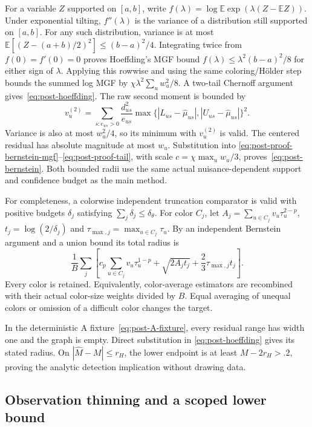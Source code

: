 For a variable $Z$ supported on $[a,b]$, write
$f(\lambda)=\log\mathbb E\exp(\lambda(Z-\mathbb EZ))$. Under exponential
tilting, $f''(\lambda)$ is the variance of a distribution still supported on
$[a,b]$. For any such distribution, variance is at most
$\mathbb E[(Z-(a+b)/2)^2]\leq(b-a)^2/4$. Integrating twice from
$f(0)=f'(0)=0$ proves Hoeffding's MGF bound
$f(\lambda)\leq\lambda^2(b-a)^2/8$ for either sign of $\lambda$.
Applying this rowwise and using the same coloring/H\"older step
bounds the summed log MGF by $\chi\lambda^2\sum_uw_u^2/8$.
A two-tail Chernoff argument gives~\eqref{eq:post-hoeffding}.
The raw second moment is bounded by
\begin{equation}
 v_u^{(2)}=\sum_{s:e_{us}>0}\frac{d_{us}^2}{e_{us}}
            \max\{|L_{us}-\widehat\mu_{us}|,
                   |U_{us}-\widehat\mu_{us}|\}^2.
\end{equation}
Variance is also at most $w_u^2/4$, so its minimum with $v_u^{(2)}$ is valid.
The centered residual has absolute magnitude at most $w_u$. Substitution into
\eqref{eq:post-proof-bernstein-mgf}--\eqref{eq:post-proof-tail}, with scale
$c=\chi\max_uw_u/3$, proves~\eqref{eq:post-bernstein}.
Both bounded radii use the same actual nuisance-dependent support and
confidence budget as the main method.

For completeness, a colorwise independent truncation comparator is valid
with positive budgets $\delta_j$ satisfying $\sum_j\delta_j\leq\delta_\theta$.
For color $C_j$, let $A_j=\sum_{u\in C_j}v_u\tau_u^{2-p}$,
$t_j=\log(2/\delta_j)$ and $\tau_{\max,j}=\max_{u\in C_j}\tau_u$.
By an independent Bernstein argument and a union bound its total radius is
\begin{equation}
 \frac 1B\sum_j\left[
     c_p\sum_{u\in C_j}v_u\tau_u^{1-p}
     +\sqrt{2A_jt_j}+\frac 23\tau_{\max,j}t_j\right].
 \label{eq:post-proof-colorwise}
\end{equation}
Every color is retained. Equivalently, color-average estimators are recombined
with their actual color-size weights divided by $B$. Equal averaging of
unequal colors or omission of a difficult color changes the target.

In the deterministic A fixture~\eqref{eq:post-A-fixture}, every residual range
has width one and the graph is empty. Direct substitution in
\eqref{eq:post-hoeffding} gives its stated radius. On
$|\widehat M-M|\leq r_H$, the lower endpoint is at least
$M-2r_H>.2$, proving the analytic detection implication without drawing data.

\subsection{Observation thinning and a scoped lower bound}
\label{app:post-lower}

